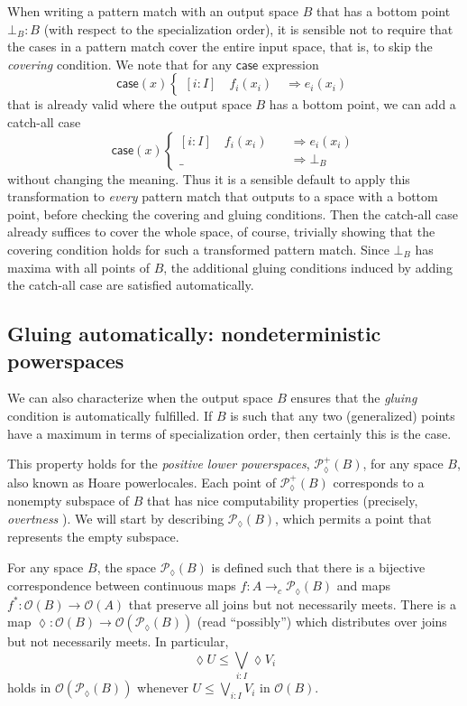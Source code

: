 \documentclass[conference]{IEEEtran}
\newcommand{\PLower}{\mathcal{P}_\lozenge}
\newcommand{\cto}{\to_c}
\newcommand{\Open}[1]{\mathcal{O}({#1})}
\newcommand{\wildcard}{\_}
\newcommand{\Branch}{\Rightarrow}
\newcommand{\iimg}[1]{#1^*}
\newcommand{\grammar}[1]{\textcolor{red}{\underline{#1}}}
\renewcommand{\grammar}[1]{#1}
\begin{document}
When writing a pattern match with an output space $B$ that has a bottom point $\bot_B : B$ (with respect to the specialization order), it is sensible not to require that the cases in a pattern match cover the entire input space, that is, to skip the \emph{covering} condition. We note that for any $\mathsf{case}$ expression
\[
\mathsf{case}(x)
\begin{cases}
[i : I] \quad f_i(x_i) \quad \Branch e_i(x_i)
\end{cases}
\]
that is already valid where the output space $B$ has a bottom point, we can add a catch-all case
\[
\mathsf{case}(x)
\begin{cases}
[i : I] \quad f_i(x_i) \quad &\Branch e_i(x_i)
\\ \wildcard \quad &\Branch \bot_B
\end{cases}
\]
without changing the meaning. Thus it is a sensible default to apply this transformation to \emph{every} pattern match that outputs to a space with a bottom point, before checking the covering and gluing conditions. Then the catch-all case already suffices to cover the whole space, of course, trivially showing that the covering condition holds for such a transformed pattern match. Since $\bot_B$ has maxima with all points of $B$, the additional gluing conditions induced by adding the catch-all case are satisfied automatically.

\subsection{Gluing automatically: nondeterministic powerspaces}

We can also characterize when the output space $B$ ensures that the \emph{gluing} condition is automatically fulfilled. If $B$ is such that any two (generalized) points have a maximum in terms of specialization order, then certainly \grammar{this} is the case.

This property holds for the \emph{positive lower powerspaces}, $\PLower^+(B)$, for any space $B$, also known as Hoare powerlocales. Each point of $\PLower^+(B)$ corresponds to a nonempty subspace of $B$ that has nice computability properties (precisely, \emph{overtness} \cite{vickersdoublepowerlocale}). We will start by describing $\PLower(B)$, which permits a point that represents the empty subspace. 

For any space $B$, the space $\PLower(B)$ is defined such that there is a bijective correspondence between continuous maps $f : A \cto \PLower(B)$ and maps $\iimg{f} : \Open{B} \to \Open{A}$ that preserve all joins but not necessarily meets. There is a map $\lozenge : \Open{B} \to \Open{\PLower(B)}$ (read ``possibly'') which distributes over joins but not necessarily meets. In particular,
\[
\lozenge U \le \bigvee_{i : I} \lozenge V_i
\]
holds in $\Open{\PLower(B)}$ whenever $U \le \bigvee_{i : I} V_i$ in $\Open{B}$. 
\end{document}
